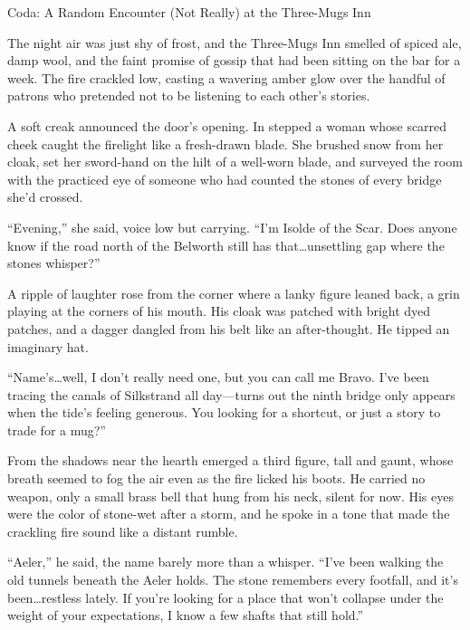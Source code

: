 \documentclass[12pt,oneside]{book}
\begin{document}
\begin{chapter*}{Coda: A Random Encounter (Not Really) at the Three-Mugs Inn}

The night air was just shy of frost, and the Three-Mugs Inn smelled of spiced ale, damp wool, and the faint promise of gossip that had been sitting on the bar for a week. The fire crackled low, casting a wavering amber glow over the handful of patrons who pretended not to be listening to each other's stories.

A soft creak announced the door's opening. In stepped a woman whose scarred cheek caught the firelight like a fresh-drawn blade. She brushed snow from her cloak, set her sword-hand on the hilt of a well-worn blade, and surveyed the room with the practiced eye of someone who had counted the stones of every bridge she'd crossed.

``Evening,'' she said, voice low but carrying. ``I'm Isolde of the Scar. Does anyone know if the road north of the Belworth still has that\dots unsettling gap where the stones whisper?''

A ripple of laughter rose from the corner where a lanky figure leaned back, a grin playing at the corners of his mouth. His cloak was patched with bright dyed patches, and a dagger dangled from his belt like an after-thought. He tipped an imaginary hat.

``Name's\dots well, I don't really need one, but you can call me Bravo. I've been tracing the canals of Silkstrand all day---turns out the ninth bridge only appears when the tide's feeling generous. You looking for a shortcut, or just a story to trade for a mug?''

From the shadows near the hearth emerged a third figure, tall and gaunt, whose breath seemed to fog the air even as the fire licked his boots. He carried no weapon, only a small brass bell that hung from his neck, silent for now. His eyes were the color of stone-wet after a storm, and he spoke in a tone that made the crackling fire sound like a distant rumble.

``Aeler,'' he said, the name barely more than a whisper. ``I've been walking the old tunnels beneath the Aeler holds. The stone remembers every footfall, and it's been\dots restless lately. If you're looking for a place that won't collapse under the weight of your expectations, I know a few shafts that still hold.''


\end{chapter*}
\end{document}
